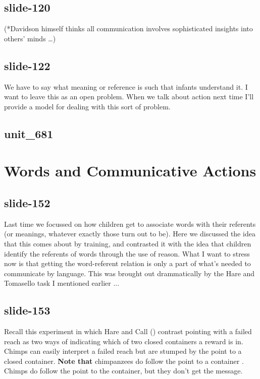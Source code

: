 \documentclass[12pt,\papersize]{extarticle}
\begin{document}
 
\subsection{slide-120}
(*Davidson himself thinks all communication involves sophisticated insights into others’ minds …)
 
 
\subsection{slide-122}
We have to say what meaning or reference is such that infants understand it. I want to leave this as an open problem. When we talk about action next time I'll provide a model for dealing with this sort of problem.
 
 
\subsection{unit\_681}
 
\section{Words and Communicative Actions}
 
 
\subsection{slide-152}
Last time we focussed on how children get to associate words with their referents (or meanings, whatever exactly those turn out to be).
Here we discussed the idea that this comes about by training, and contrasted it with the idea that children identify the referents of words through the use of reason.
What I want to stress now is that getting the word-referent relation is only a part of what's needed to communicate by language.
This was brought out drammatically by the Hare and Tomasello task I mentioned earlier ...
 
 
\subsection{slide-153}
Recall this experiment in which Hare and Call (\citeyear{hare_chimpanzees_2004}) contrast pointing with a failed reach as two ways of indicating which of two closed containers a reward is in. Chimps can easily interpret a failed reach but are stumped by the point to a closed container.
\textbf{Note that} chimpanzees do follow the point to a container \citep[see][p.\ 6]{Moll:2007gu}.
Chimps do follow the point to the container, but they don't get the message.
 
\end{document}
